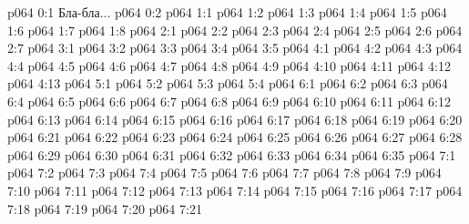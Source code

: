 \author{Носитель Жизни}
\vs p064 0:1  Бла-бла...
\vs p064 0:2 
\vs p064 1:1 
\vs p064 1:2 
\vs p064 1:3 
\vs p064 1:4 \pc 
\vs p064 1:5 
\vs p064 1:6 \pc 
\vs p064 1:7 
\vs p064 1:8 
\vs p064 2:1 
\vs p064 2:2 
\vs p064 2:3 
\vs p064 2:4 
\vs p064 2:5 \pc 
\vs p064 2:6 
\vs p064 2:7 
\vs p064 3:1 
\vs p064 3:2 
\vs p064 3:3 
\vs p064 3:4 
\vs p064 3:5 \pc 
{}
\vs p064 4:1 
\vs p064 4:2 \pc 
\vs p064 4:3 
\vs p064 4:4 \pc 
\vs p064 4:5 
\vs p064 4:6 \pc 
\vs p064 4:7 
\vs p064 4:8 \pc 
\vs p064 4:9 \pc 
\vs p064 4:10 \pc 
\vs p064 4:11 
\vs p064 4:12 \pc 
\vs p064 4:13 
\vs p064 5:1 
\vs p064 5:2 
\vs p064 5:3 
\vs p064 5:4 
\vs p064 6:1 
\vs p064 6:2 
\vs p064 6:3 
\vs p064 6:4 
\vs p064 6:5 
\vs p064 6:6 
\vs p064 6:7 
\vs p064 6:8 
\vs p064 6:9 
\vs p064 6:10 
\vs p064 6:11 
\vs p064 6:12 
\vs p064 6:13 
\vs p064 6:14 
\vs p064 6:15 
\vs p064 6:16 
\vs p064 6:17 
\vs p064 6:18 
\vs p064 6:19 
\vs p064 6:20 
\vs p064 6:21 
\vs p064 6:22 
\vs p064 6:23 
\vs p064 6:24 
\vs p064 6:25 
\vs p064 6:26 
\vs p064 6:27 
\vs p064 6:28 \pc 
\vs p064 6:29 \pc 
\vs p064 6:30 \pc 
\vs p064 6:31 
\vs p064 6:32 
\vs p064 6:33 
\vs p064 6:34 
\vs p064 6:35 
\vs p064 7:1 
\vs p064 7:2 
\vs p064 7:3 
\vs p064 7:4 
\vs p064 7:5 
\vs p064 7:6 
\vs p064 7:7 
\vs p064 7:8 
\vs p064 7:9 
\vs p064 7:10 
\vs p064 7:11 
\vs p064 7:12 \pc 
\vs p064 7:13 \pc 
\vs p064 7:14 
\vs p064 7:15 
\vs p064 7:16 
\vs p064 7:17 \pc 
\vs p064 7:18 
\vs p064 7:19 
\vs p064 7:20 \pc 
\vsetoff
\vs p064 7:21 
\quizlink
